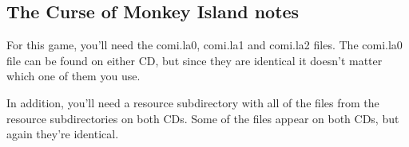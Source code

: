 


\subsection{The Curse of Monkey Island notes}

For this game, you'll need the comi.la0, comi.la1 and comi.la2 files. The
comi.la0 file can be found on either CD, but since they are identical it
doesn't matter which one of them you use.

In addition, you'll need a resource subdirectory with all of the files from the
resource subdirectories on both CDs. Some of the files appear on both CDs, but
again they're identical.
